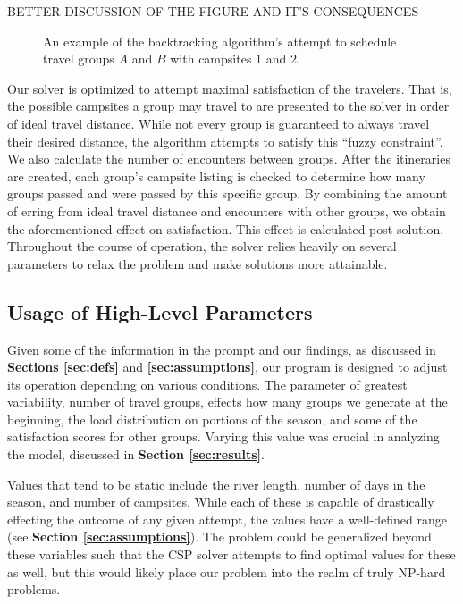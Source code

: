 \documentclass[11pt]{article} %
\begin{document}
BETTER DISCUSSION OF THE FIGURE AND IT'S CONSEQUENCES

\begin{figure}[h]
  \centering
  \caption{An example of the backtracking algorithm's attempt to schedule
    travel groups $A$ and $B$ with campsites $1$ and $2$.}
  \label{fig:searchExample}
\end{figure}

Our solver is optimized to attempt maximal satisfaction of the travelers.
That is, the possible campsites a group may travel to are presented to the
solver in order of ideal travel distance.  While not every group is guaranteed
to always travel their desired distance, the algorithm attempts to satisfy
this ``fuzzy constraint''.  We also calculate the number of encounters
between groups.  After the itineraries are created, each group's campsite
listing is checked to determine how many groups passed and were passed by
this specific group.  By combining the amount of erring from ideal travel distance
and encounters with other groups, we obtain the aforementioned effect on
satisfaction.  This effect is calculated post-solution.
Throughout the course of operation, the solver relies heavily on several
parameters to relax the problem and make solutions more attainable.

\subsection{Usage of High-Level Parameters}
\label{sec:high-params}
Given some of the information in the prompt and our findings, as discussed
in \textbf{Sections \ref{sec:defs}} and \textbf{\ref{sec:assumptions}}, our program
is designed to adjust its operation depending on various conditions.  The
parameter of greatest variability, number of travel groups, effects how
many groups we generate at the beginning, the load distribution on portions
of the season, and some of the satisfaction scores for other groups. Varying
this value was crucial in analyzing the model, discussed in \textbf{Section
\ref{sec:results}}.

Values that tend to be static include the river length, number of days in
the season, and number of campsites.  While each of these is capable of
drastically effecting the outcome of any given attempt, the values have a
well-defined range (see \textbf{Section \ref{sec:assumptions}}).  The problem
could be generalized beyond these variables such that the CSP solver attempts
to find optimal values for these as well, but this would likely place our
problem into the realm of truly NP-hard problems.
\end{document}
